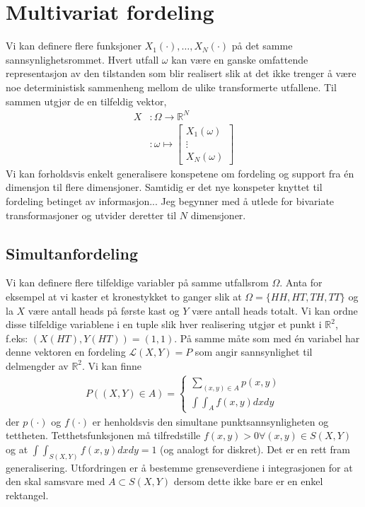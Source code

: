 \section{Multivariat fordeling}
Vi kan definere flere funksjoner $X_1(\cdot),\dots,X_N(\cdot)$ på det samme sannsynlighetsrommet. Hvert utfall $\omega$ kan være en ganske omfattende representasjon av den tilstanden som blir realisert slik at det ikke trenger å være noe deterministisk sammenheng mellom de ulike transformerte utfallene. Til sammen utgjør de en tilfeldig vektor,
\begin{align}
X&: \Omega \to \mathbb{R}^N \\
&:\omega \mapsto 
\begin{bmatrix}
X_1(\omega) \\
\vdots \\
X_N(\omega)
\end{bmatrix}
\end{align}
Vi kan forholdsvis enkelt generalisere konspetene om fordeling og support fra én dimensjon til flere dimensjoner. Samtidig er det nye konspeter knyttet til fordeling betinget av informasjon... Jeg begynner med å utlede for bivariate transformasjoner og utvider deretter til $N$ dimensjoner.
\subsection{Simultanfordeling}
Vi kan definere flere tilfeldige variabler på samme utfallsrom $\Omega$. Anta for eksempel at vi kaster et kronestykket to ganger slik at $\Omega = \{HH,HT,TH,TT\}$ og la $X$ være antall heads på første kast og $Y$ være antall heads totalt. Vi kan ordne disse tilfeldige variablene i en tuple slik hver realisering utgjør et punkt i $\mathbb{R}^2$, f.eks: $(X(HT),Y(HT)) = (1,1)$. På samme måte som med én variabel har denne vektoren en fordeling $\mathcal{L}(X,Y) = P$ som angir sannsynlighet til delmengder av $\mathbb{R}^2$. Vi kan finne
\begin{align}
P((X,Y)\in A) = 
\begin{cases}
\sum_{(x,y)\in A}p(x,y) \\
\int \int_A f(x,y)dxdy
\end{cases}
\end{align}
der $p(\cdot)$ og $f(\cdot)$ er henholdsvis den simultane punktsannsynligheten og tettheten. Tetthetsfunksjonen må tilfredstille $f(x,y)>0 \forall (x,y) \in S(X,Y)$ og at $\int \int_{S(X,Y)} f(x,y)dxdy=1$ (og analogt for diskret). Det er en rett fram generalisering. Utfordringen er å bestemme grenseverdiene i integrasjonen for at den skal samsvare med $A \subset S(X,Y)$ dersom dette ikke bare er en enkel rektangel.

